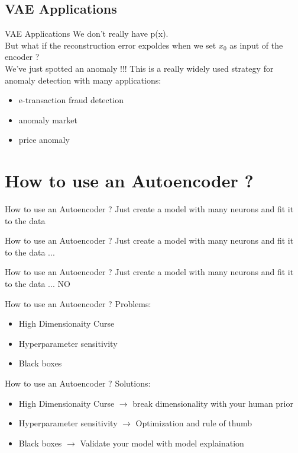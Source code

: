 \documentclass{beamer}
\begin{document}
\subsection{VAE Applications}
\begin{frame}{VAE Applications}
    We don't really have p(x).\\
    But what if the reconstruction error expoldes when we set $x_0$ as input of the encoder ? \\
    We've just spotted an anomaly !!!
    This is a really widely used strategy for anomaly detection with many applications:
    \begin{itemize}
        \item e-transaction fraud detection
        \item anomaly market
        \item price anomaly
    \end{itemize}
\end{frame} 

\section{How to use an Autoencoder ?}
\begin{frame}{How to use an Autoencoder ?}
    Just create a model with many neurons and fit it to the data
\end{frame}

\begin{frame}{How to use an Autoencoder ?}
    Just create a model with many neurons and fit it to the data ...
\end{frame}

\begin{frame}{How to use an Autoencoder ?}
    Just create a model with many neurons and fit it to the data ... NO
\end{frame}

\begin{frame}{How to use an Autoencoder ?}
    Problems:
    \begin{itemize}
        \item High Dimensionaity Curse
        \item Hyperparameter sensitivity 
        \item Black boxes 
    \end{itemize}
\end{frame}

\begin{frame}{How to use an Autoencoder ?}
    Solutions:
    \begin{itemize}
        \item High Dimensionaity Curse $\rightarrow$ break dimensionality with your human prior
        \item Hyperparameter sensitivity $\rightarrow$ Optimization and rule of thumb 
        \item Black boxes  $\rightarrow$ Validate your model with model explaination
    \end{itemize}
\end{frame}
\end{document}

